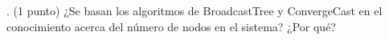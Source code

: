 . (1 punto) ¿Se basan los algoritmos de BroadcastTree y ConvergeCast en el conocimiento acerca del número de nodos en el sistema? ¿Por qué? 


